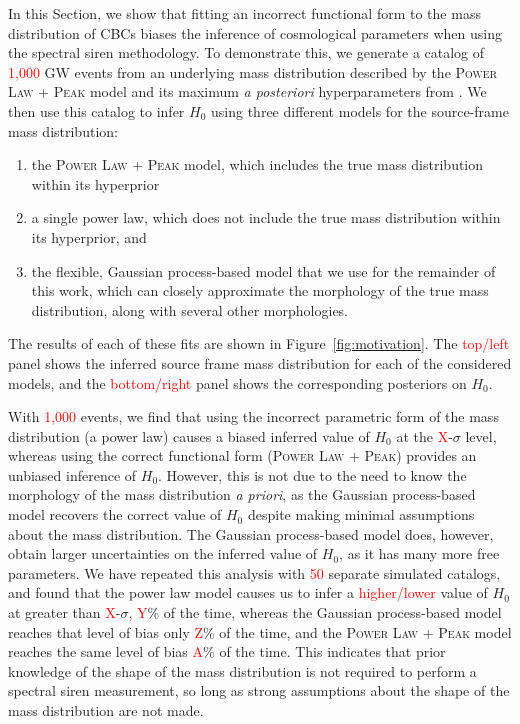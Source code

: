 \documentclass[]{aastex631}
\newcommand{\Ho}{$H_0$}
\newcommand{\plp}{\textsc{Power Law + Peak}}
\newcommand{\result}[1]{\textcolor{red}{#1}}
\begin{document}
In this Section, we show that fitting an incorrect functional form to the mass distribution of CBCs biases the inference of cosmological parameters when using the spectral siren methodology.
To demonstrate this, we generate a catalog of \result{1,000} GW events from an underlying mass distribution described by the \plp{} model and its maximum \emph{a posteriori} hyperparameters from \citet{o3b_pop}.
We then use this catalog to infer \Ho{} using three different models for the source-frame mass distribution:
\begin{enumerate}
    \item the \plp{} model, which includes the true mass distribution within its hyperprior
    \item a single power law, which does not include the true mass distribution within its hyperprior, and 
    \item the flexible, Gaussian process-based model that we use for the remainder of this work, which can closely approximate the morphology of the true mass distribution, along with several other morphologies.
\end{enumerate}
The results of each of these fits are shown in Figure~\ref{fig:motivation}. 
The \result{top/left} panel shows the inferred source frame mass distribution for each of the considered models, and the \result{bottom/right} panel shows the corresponding posteriors on \Ho{}.

With \result{1,000} events, we find that using the incorrect parametric form of the mass distribution (a power law) causes a biased inferred value of \Ho{} at the \result{X}-$\sigma$ level, whereas using the correct functional form (\plp) provides an unbiased inference of \Ho.
However, this is not due to the need to know the morphology of the mass distribution \emph{a priori}, as the Gaussian process-based model recovers the correct value of \Ho{} despite making minimal assumptions about the mass distribution.
The Gaussian process-based model does, however, obtain larger uncertainties on the inferred value of \Ho, as it has many more free parameters.
We have repeated this analysis with \result{50} separate simulated catalogs, and found that the power law model causes us to infer a \result{higher/lower} value of \Ho{} at greater than \result{X}-$\sigma$, \result{Y}\% of the time, whereas the Gaussian process-based model reaches that level of bias only \result{Z}\% of the time, and the \plp{} model reaches the same level of bias \result{A}\% of the time.
This indicates that prior knowledge of the shape of the mass distribution is not required to perform a spectral siren measurement, so long as strong assumptions about the shape of the mass distribution are not made.
\end{document}
